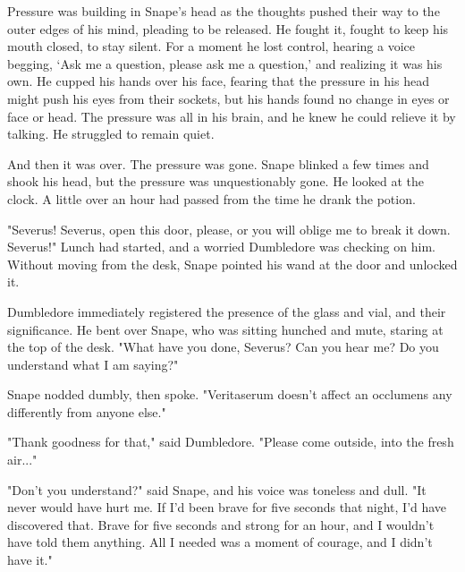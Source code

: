 Pressure was building in Snape's head as the thoughts pushed their way to the outer edges of his mind, pleading to be released. He fought it, fought to keep his mouth closed, to stay silent. For a moment he lost control, hearing a voice begging, `Ask me a question, please ask me a question,' and realizing it was his own. He cupped his hands over his face, fearing that the pressure in his head might push his eyes from their sockets, but his hands found no change in eyes or face or head. The pressure was all in his brain, and he knew he could relieve it by talking. He struggled to remain quiet.

And then it was over. The pressure was gone. Snape blinked a few times and shook his head, but the pressure was unquestionably gone. He looked at the clock. A little over an hour had passed from the time he drank the potion.

"Severus! Severus, open this door, please, or you will oblige me to break it down. Severus!" Lunch had started, and a worried Dumbledore was checking on him. Without moving from the desk, Snape pointed his wand at the door and unlocked it.

Dumbledore immediately registered the presence of the glass and vial, and their significance. He bent over Snape, who was sitting hunched and mute, staring at the top of the desk. "What have you done, Severus? Can you hear me? Do you understand what I am saying?"

Snape nodded dumbly, then spoke. "Veritaserum doesn't affect an occlumens any differently from anyone else."

"Thank goodness for that," said Dumbledore. "Please come outside, into the fresh air..."

"Don't you understand?" said Snape, and his voice was toneless and dull. "It never would have hurt me. If I'd been brave for five seconds that night, I'd have discovered that. Brave for five seconds and strong for an hour, and I wouldn't have told them anything. All I needed was a moment of courage, and I didn't have it."


